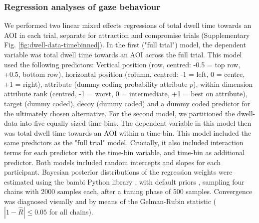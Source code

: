 \documentclass[11pt, a4paper]{article}
\begin{document}
\begin{refsection}
\subsubsection*{Regression analyses of gaze behaviour}
We performed two linear mixed effects regressions of total dwell time towards an AOI in each trial, separate for attraction and compromise trials (Supplementary Fig. \ref{fig:dwell-data-timebinned}). In the first ("full trial") model, the dependent variable was total dwell time towards an AOI across the full trial. This model used the following predictors: Vertical position (row, centred: -0.5 = top row, +0.5, bottom row), horizontal position (column, centred: -1 = left, 0 = centre, +1 = right), attribute (dummy coding probability attribute $p$), within dimension attribute rank (centred, -1 = worst, 0 = intermediate, +1 = best on attribute), target (dummy coded), decoy (dummy coded) and a dummy coded predictor for the ultimately chosen alternative. For the second model, we partitioned the dwell-data into five equally sized time-bins. The dependent variable in this model then was total dwell time towards an AOI within a time-bin. This model included the same predictors as the "full trial" model. Crucially, it also included interaction terms for each predictor with the time-bin variable, and time-bin as additional predictor. Both models included random intercepts and slopes for each participant. Bayesian posterior distributions of the regression weights were estimated using the bambi Python library \parencite{yarkoni2016BambiSimpleInterface}, with default priors \parencite{westfall2017StatisticalDetailsDefault}, sampling four chains with 2000 samples each, after a tuning phase of 500 samples. Convergence was diagnosed visually and by means of the Gelman-Rubin statistic ($|1 - \hat{R}| \le 0.05$ for all chains).


\end{refsection}
\end{document}
